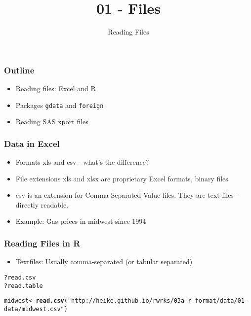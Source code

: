 \documentclass{beamer}\usepackage[]{graphicx}\usepackage[]{color}
\title[1-Files]{01 - Files}
\subtitle{Reading Files}
\date{\hspace{1in}}
\institute[ISU]{Iowa State University}
\makeatletter
\newcommand{\hlstr}[1]{\textcolor[rgb]{0.192,0.494,0.8}{#1}}%
\newcommand{\hlopt}[1]{\textcolor[rgb]{0,0,0}{#1}}%
\newcommand{\hlstd}[1]{\textcolor[rgb]{0.345,0.345,0.345}{#1}}%
\newcommand{\hlkwb}[1]{\textcolor[rgb]{0.69,0.353,0.396}{#1}}%
\newcommand{\hlkwd}[1]{\textcolor[rgb]{0.737,0.353,0.396}{\textbf{#1}}}%
\newenvironment{kframe}{%
 \def\at@end@of@kframe{}%
 \ifinner\ifhmode%
  \def\at@end@of@kframe{\end{minipage}}%
  \begin{minipage}{\columnwidth}%
 \fi\fi%
 \def\FrameCommand##1{\hskip\@totalleftmargin \hskip-\fboxsep
 \colorbox{shadecolor}{##1}\hskip-\fboxsep
     \hskip-\linewidth \hskip-\@totalleftmargin \hskip\columnwidth}%
 \MakeFramed {\advance\hsize-\width
   \@totalleftmargin\z@ \linewidth\hsize
   \@setminipage}}%
 {\par\unskip\endMakeFramed%
 \at@end@of@kframe}
\newenvironment{knitrout}{}{} %
\makeatother
\begin{document}
\begin{frame}
\maketitle
\end{frame}



\begin{frame}
\frametitle{Outline}
\begin{itemize}
\item Reading files: Excel and R\medskip
\item Packages \texttt{gdata} and \texttt{foreign} \medskip
\item Reading SAS xport files\medskip
\end{itemize}
\end{frame}


\begin{frame}
\frametitle{Data in Excel}
\begin{itemize}
\item Formats xls and csv - what's the difference?
\item File extensions xls and xlsx are proprietary Excel formats, binary files
\item csv is an extension for Comma Separated Value files. They are text files - directly readable.
\item Example: Gas prices in midwest since 1994
\end{itemize}
\end{frame}

\begin{frame}
\frametitle{Reading Files in R}
\begin{itemize}
\item Textfiles: Usually comma-separated (or tabular separated)
\end{itemize}
\begin{knitrout}\scriptsize
{}\color{fgcolor}\begin{kframe}
\begin{alltt}
\hlopt{?}\hlstd{read.csv}
\hlopt{?}\hlstd{read.table}
\end{alltt}
\end{kframe}
\end{knitrout}
\begin{knitrout}\scriptsize
{}\color{fgcolor}\begin{kframe}
\begin{alltt}
\hlstd{midwest} \hlkwb{<-} \hlkwd{read.csv}\hlstd{(}\hlstr{"http://heike.github.io/rwrks/03a-r-format/data/01-data/midwest.csv"}\hlstd{)}
\end{alltt}
\end{kframe}
\end{knitrout}
\end{frame}
\end{document}
